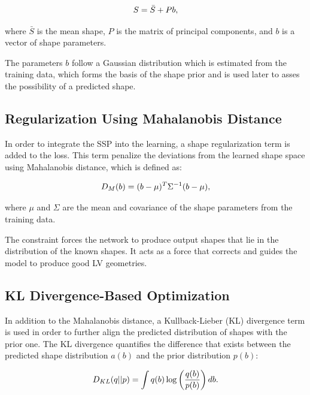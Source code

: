 \begin{equation} 
\addcontentsline{equ}{equations}{\protect\numberline{\theequation}Statistical Shape Model}
S = \bar{S} + Pb, 
\end{equation} 

where $\bar{S}$ is the mean shape, $P$ is the matrix of principal components, and $b$ is a vector of shape parameters.

The parameters $b$ follow a Gaussian distribution which is estimated from the training data, which forms the basis of the shape prior and is used later to asses the possibility of a predicted shape.

\subsection{Regularization Using Mahalanobis Distance}
In order to integrate the SSP into the learning, a shape regularization term is added to the loss. This term penalize the deviations from the learned shape space using Mahalanobis distance, which is defined as:

\begin{equation} 
\addcontentsline{equ}{equations}{\protect\numberline{\theequation}Mahalanobis Distance}
D_M(b) = (b - \mu)^T \Sigma^{-1} (b - \mu), 
\end{equation}

where $\mu$ and $\Sigma$ are the mean and covariance of the shape parameters from the training data.

The constraint forces the network to produce output shapes that lie in the distribution of the known shapes. It acts as a force that corrects and guides the model to produce good LV geometries.

\subsection{KL Divergence-Based Optimization}
In addition to the Mahalanobis distance, a Kullback-Lieber (KL) divergence term is used in order to further align the predicted distribution of shapes with the prior one. The KL divergence quantifies the difference that exists between the predicted shape distribution $a(b)$ and the prior distribution $p(b)$:

\begin{equation} 
\addcontentsline{equ}{equations}{\protect\numberline{\theequation}KL Divergence}
D_{KL}(q || p) = \int q(b) \log \left(\frac{q(b)}{p(b)}\right) db. 
\end{equation}

